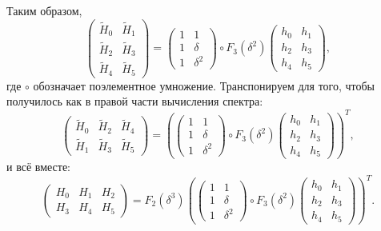 Таким образом,
\[
    \begin{pmatrix}
        \widetilde{H}_0 & \widetilde{H}_1 \\
        \widetilde{H}_2 & \widetilde{H}_3 \\
        \widetilde{H}_4 & \widetilde{H}_5
    \end{pmatrix}
    =
    \begin{pmatrix}
        1 & 1        \\
        1 & \delta   \\
        1 & \delta^2
    \end{pmatrix}
    \circ
    F_3(\delta^2)
    \begin{pmatrix}
        h_0 & h_1 \\
        h_2 & h_3 \\
        h_4 & h_5
    \end{pmatrix} ,
\]
где $\circ$ обозначает поэлементное умножение. Транспонируем для того, чтобы получилось как в правой части вычисления спектра:
\[
    \begin{pmatrix}
        \widetilde{H}_0 & \widetilde{H}_2 & \widetilde{H}_4 \\
        \widetilde{H}_1 & \widetilde{H}_3 & \widetilde{H}_5
    \end{pmatrix}
    =
    \left (
    \begin{pmatrix}
        1 & 1        \\
        1 & \delta   \\
        1 & \delta^2
    \end{pmatrix}
    \circ
    F_3(\delta^2)
    \begin{pmatrix}
        h_0 & h_1 \\
        h_2 & h_3 \\
        h_4 & h_5
    \end{pmatrix}
    \right )^T ,
\]
и всё вместе:
\[
    \begin{pmatrix}
        H_0 & H_1 & H_2 \\
        H_3 & H_4 & H_5
    \end{pmatrix}
    =
    F_2(\delta^3)
    \left (
    \begin{pmatrix}
        1 & 1        \\
        1 & \delta   \\
        1 & \delta^2
    \end{pmatrix}
    \circ
    F_3(\delta^2)
    \begin{pmatrix}
        h_0 & h_1 \\
        h_2 & h_3 \\
        h_4 & h_5
    \end{pmatrix}
    \right )^T .
\]

